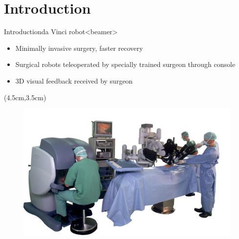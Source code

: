 \section{Introduction}
\begin{frame}{Introduction}{da Vinci robot}<beamer>
\begin{itemize}
\item Minimally invasive surgery, faster recovery
\item Surgical robots teleoperated by specially trained surgeon through console

\item 3D visual feedback received by surgeon
\end{itemize}

\begin{textblock*}{0.7\textwidth}(4.5cm,3.5cm) %
	\begin{figure}[H]
		\centering
		\centering
		\includegraphics[width=1\textwidth]{Billeder/Dan/davinci.jpg}
	\end{figure}
\end{textblock*}

\end{frame}

